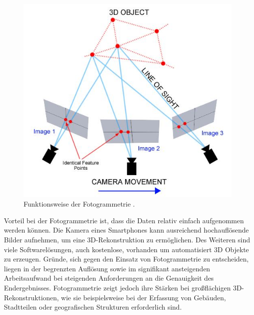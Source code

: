 \begin{figure}[H]
    \centering
    \includegraphics[width=0.7\linewidth]{images/photogrammetry.jpg}
    \caption{Funktionsweise der Fotogrammetrie \cite{.13.08.2024}.}
    \label{fig:photogammatry}
\end{figure}

Vorteil bei der Fotogrammetrie ist, dass die Daten relativ einfach aufgenommen werden
können. Die Kamera eines Smartphones kann ausreichend hochauflösende Bilder aufnehmen, um 
eine 3D-Rekonstruktion zu ermöglichen. Des Weiteren sind viele Softwarelösungen,
auch kostenlose, vorhanden um automatisiert 3D Objekte zu erzeugen.
Gründe, sich gegen den Einsatz von Fotogrammetrie zu entscheiden, 
liegen in der begrenzten Auflösung sowie im signifikant ansteigenden Arbeitsaufwand 
bei steigenden Anforderungen an die Genauigkeit des Endergebnisses. 
Fotogrammetrie zeigt jedoch ihre Stärken bei großflächigen 3D-Rekonstruktionen, 
wie sie beispielsweise bei der Erfassung von Gebäuden, Stadtteilen oder geografischen 
Strukturen erforderlich sind.

